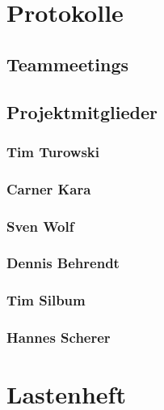 



\maketitle
\tableofcontents

\newpage
\section{Protokolle}

\subsection{Teammeetings}


\newpage
\subsection{Projektmitglieder}
\subsubsection{Tim Turowski}


\subsubsection{Carner Kara}


\subsubsection{Sven Wolf}


\subsubsection{Dennis Behrendt}


\subsubsection{Tim Silbum}


\subsubsection{Hannes Scherer}


\newpage
\section{Lastenheft}


